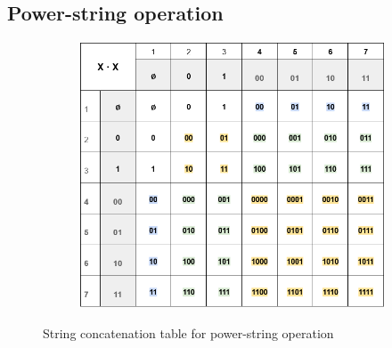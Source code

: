 \begin{appendices}
  \subsection{Power-string operation}
  \begin{figure}[h!]
    \centering
    \begin{subfigure}[b]{0.8\linewidth}
      \includegraphics[width=\linewidth]{appendix/power-string.png}
    \end{subfigure}
    \caption{String concatenation table for power-string operation}
    \label{fig:pwrstr}
  \end{figure}


\end{appendices}
